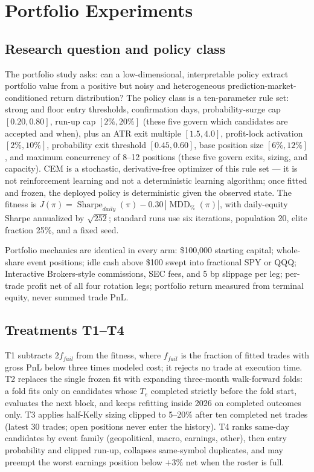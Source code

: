 \documentclass[sigconf,anonymous]{acmart}
\begin{document}
\section{Portfolio Experiments}
\label{sec:cem}

\subsection{Research question and policy class}

The portfolio study asks: can a low-dimensional, interpretable policy extract portfolio value from a positive but noisy and heterogeneous prediction-market-conditioned return distribution? The policy class is a ten-parameter rule set: strong and floor entry thresholds, confirmation days, probability-surge cap $[0.20,0.80]$, run-up cap $[2\%,20\%]$ (these five govern which candidates are accepted and when), plus an ATR exit multiple $[1.5,4.0]$, profit-lock activation $[2\%,10\%]$, probability exit threshold $[0.45,0.60]$, base position size $[6\%,12\%]$, and maximum concurrency of 8--12 positions (these five govern exits, sizing, and capacity). CEM is a stochastic, derivative-free optimizer of this rule set --- it is not reinforcement learning and not a deterministic learning algorithm; once fitted and frozen, the deployed policy is deterministic given the observed state. The fitness is $J(\pi)=\operatorname{Sharpe}_{daily}(\pi)-0.30\,|\operatorname{MDD}_{\%}(\pi)|$, with daily-equity Sharpe annualized by $\sqrt{252}$; standard runs use six iterations, population 20, elite fraction 25\%, and a fixed seed.

Portfolio mechanics are identical in every arm: \$100{,}000 starting capital; whole-share event positions; idle cash above \$100 swept into fractional SPY or QQQ; Interactive Brokers-style commissions, SEC fees, and 5 bp slippage per leg; per-trade profit net of all four rotation legs; portfolio return measured from terminal equity, never summed trade PnL.

\subsection{Treatments T1--T4}

T1 subtracts $2f_{fail}$ from the fitness, where $f_{fail}$ is the fraction of fitted trades with gross PnL below three times modeled cost; it rejects no trade at execution time. T2 replaces the single frozen fit with expanding three-month walk-forward folds: a fold fits only on candidates whose $T_e$ completed strictly before the fold start, evaluates the next block, and keeps refitting inside 2026 on completed outcomes only. T3 applies half-Kelly sizing clipped to 5--20\% after ten completed net trades (latest 30 trades; open positions never enter the history). T4 ranks same-day candidates by event family (geopolitical, macro, earnings, other), then entry probability and clipped run-up, collapses same-symbol duplicates, and may preempt the worst earnings position below $+3\%$ net when the roster is full.
\end{document}
